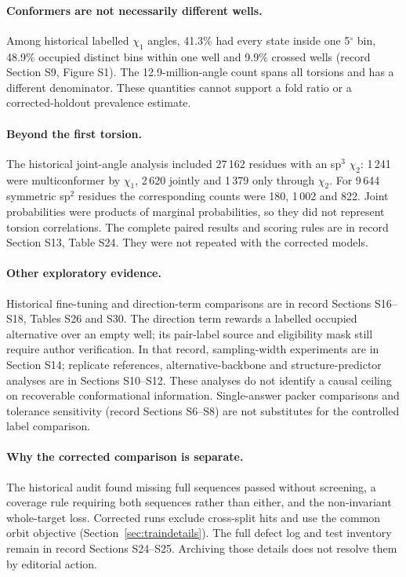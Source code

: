 \documentclass[10pt,a4paper]{article}
\begin{document}
\paragraph{Conformers are not necessarily different wells.} Among historical labelled $\chi_1$ angles, 41.3\% had every state inside one 5$^\circ$ bin, 48.9\% occupied distinct bins within one well and 9.9\% crossed wells (record Section S9, Figure S1). The 12.9-million-angle count spans all torsions and has a different denominator. These quantities cannot support a fold ratio or a corrected-holdout prevalence estimate.

\paragraph{Beyond the first torsion.} The historical joint-angle analysis included 27\,162 residues with an sp$^3$ $\chi_2$: 1\,241 were multiconformer by $\chi_1$, 2\,620 jointly and 1\,379 only through $\chi_2$. For 9\,644 symmetric sp$^2$ residues the corresponding counts were 180, 1\,002 and 822. Joint probabilities were products of marginal probabilities, so they did not represent torsion correlations. The complete paired results and scoring rules are in record Section S13, Table S24. They were not repeated with the corrected models.

\paragraph{Other exploratory evidence.} Historical fine-tuning and direction-term comparisons are in record Sections S16--S18, Tables S26 and S30. The direction term rewards a labelled occupied alternative over an empty well; its pair-label source and eligibility mask still require author verification. In that record, sampling-width experiments are in Section S14; replicate references, alternative-backbone and structure-predictor analyses are in Sections S10--S12. These analyses do not identify a causal ceiling on recoverable conformational information. Single-answer packer comparisons and tolerance sensitivity (record Sections S6--S8) are not substitutes for the controlled label comparison.

\paragraph{Why the corrected comparison is separate.} The historical audit found missing full sequences passed without screening, a coverage rule requiring both sequences rather than either, and the non-invariant whole-target loss. Corrected runs exclude cross-split hits and use the common orbit objective (Section~\ref{sec:traindetails}). The full defect log and test inventory remain in record Sections S24--S25. Archiving those details does not resolve them by editorial action.
\end{document}
